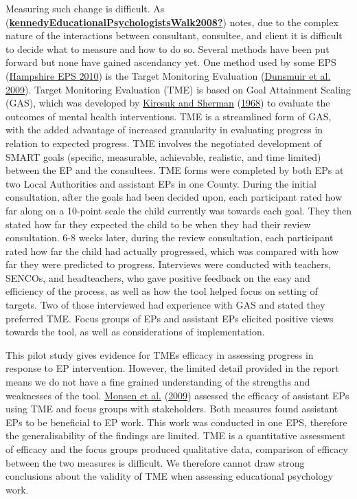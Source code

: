 \documentclass[
]{article}
\begin{document}
Measuring such change is difficult. As
(\protect\hyperlink{ref-kennedyEducationalPsychologistsWalk2008}{\textbf{kennedyEducationalPsychologistsWalk2008?}})
notes, due to the complex nature of the interactions between consultant,
consultee, and client it is difficult to decide what to measure and how
to do so. Several methods have been put forward but none have gained
ascendancy yet. One method used by some EPS
(\protect\hyperlink{ref-hampshireepsHowEducationalPsychology2010}{Hampshire
EPS 2010}) is the Target Monitoring Evaluation
(\protect\hyperlink{ref-dunsmuirEvidenceBasedPractice2009}{Dunsmuir et
al. 2009}). Target Monitoring Evaluation (TME) is based on Goal
Attainment Scaling (GAS), which was developed by
\protect\hyperlink{ref-kiresukGoalAttainmentScaling1968}{Kiresuk and
Sherman}
(\protect\hyperlink{ref-kiresukGoalAttainmentScaling1968}{1968}) to
evaluate the outcomes of mental health interventions. TME is a
streamlined form of GAS, with the added advantage of increased
granularity in evaluating progress in relation to expected progress. TME
involves the negotiated development of SMART goals (specific,
measurable, achievable, realistic, and time limited) between the EP and
the consultees. TME forms were completed by both EPs at two Local
Authorities and assistant EPs in one County. During the initial
consultation, after the goals had been decided upon, each participant
rated how far along on a 10-point scale the child currently was towards
each goal. They then stated how far they expected the child to be when
they had their review consultation. 6-8 weeks later, during the review
consultation, each participant rated how far the child had actually
progressed, which was compared with how far they were predicted to
progress. Interviews were conducted with teachers, SENCOs, and
headteachers, who gave positive feedback on the easy and efficiency of
the process, as well as how the tool helped focus on setting of targets.
Two of those interviewed had experience with GAS and stated they
preferred TME. Focus groups of EPs and assistant EPs elicited positive
views towards the tool, as well as considerations of implementation.

This pilot study gives evidence for TMEs efficacy in assessing progress
in response to EP intervention. However, the limited detail provided in
the report means we do not have a fine grained understanding of the
strengths and weaknesses of the tool.
\protect\hyperlink{ref-monsenEvaluationPreTraining2009}{Monsen et al.}
(\protect\hyperlink{ref-monsenEvaluationPreTraining2009}{2009}) assessed
the efficacy of assistant EPs using TME and focus groups with
stakeholders. Both measures found assistant EPs to be beneficial to EP
work. This work was conducted in one EPS, therefore the generalisability
of the findings are limited. TME is a quantitative assessment of
efficacy and the focus groups produced qualitative data, comparison of
efficacy between the two measures is difficult. We therefore cannot draw
strong conclusions about the validity of TME when assessing educational
psychology work.
\end{document}

